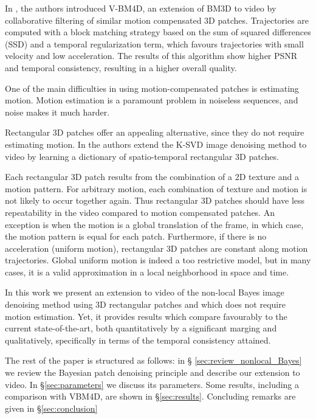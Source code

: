 \documentclass[10pt, journal, twocolumn, final, a4paper]{IEEEtran}
\begin{document}
In \cite{Maggioni2011,Maggioni2012}, the authors introduced V-BM4D, an
extension of BM3D to video by collaborative filtering of similar motion
compensated 3D patches. Trajectories are computed with a block matching
strategy based on the sum of squared differences (SSD) and a temporal
regularization term, which favours trajectories with small velocity and low
acceleration. The results of this algorithm show higher PSNR and temporal
consistency, resulting in a higher overall quality.

One of the main difficulties in using motion-compensated patches is estimating
motion. Motion estimation is a paramount problem in noiseless sequences, and
noise makes it much harder.

Rectangular 3D patches offer an appealing
alternative, since they do not require estimating motion. 
In \cite{Protter2007,Protter2009} the authors extend the K-SVD \cite{Elad2006}
image denoising method to video by learning a dictionary of spatio-temporal
rectangular 3D patches.

Each rectangular 3D patch results from the combination of a 2D texture and a
motion pattern. For arbitrary motion, each combination of texture and motion is
not likely to occur together again. Thus rectangular 3D patches should have
less repeatability in the video compared to motion compensated patches.  An
exception is when the motion is a global translation of the frame, in which
case, the motion pattern is equal for each patch. Furthermore, if there is no
acceleration (uniform motion), rectangular 3D patches are constant along motion
trajectories. Global uniform motion is indeed a too restrictive model, but in
many cases, it is a valid approximation in a local neighborhood in space and
time.

\bigskip

In this work we present an extension to video of the non-local Bayes image
denoising method \cite{Lebrun2013a,Lebrun2013ipol} using 3D rectangular
patches and which does not require motion estimation. Yet, it provides
results which compare favourably to the current state-of-the-art,
both quantitatively by a significant marging and qualitatively, specifically in
terms of the temporal consistency attained.

\bigskip

The rest of the paper is structured as follows: in \S
\ref{sec:review_nonlocal_Bayes} we review the Bayesian patch denoising principle 
and describe our extension to video. In \S \ref{sec:parameters}
we discuss its parameters. Some results, including a comparison with VBM4D, are shown
in \S \ref{sec:results}. Concluding remarks are given in \S \ref{sec:conclusion}
\end{document}
